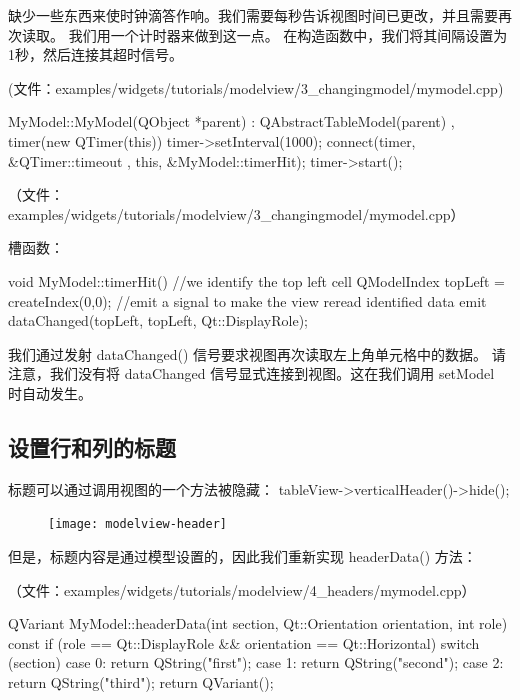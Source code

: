 缺少一些东西来使时钟滴答作响。我们需要每秒告诉视图时间已更改，并且需要再次读取。
我们用一个计时器来做到这一点。
在构造函数中，我们将其间隔设置为1秒，然后连接其超时信号。

(文件：examples/widgets/tutorials/modelview/3\_changingmodel/mymodel.cpp)

\begin{cppcode}
MyModel::MyModel(QObject *parent)
    : QAbstractTableModel(parent)
    , timer(new QTimer(this))
{
    timer->setInterval(1000);
    connect(timer, &QTimer::timeout , this, &MyModel::timerHit);
    timer->start();
}
\end{cppcode}

（文件：examples/widgets/tutorials/modelview/3\_changingmodel/mymodel.cpp）

槽函数：

\begin{cppcode}
void MyModel::timerHit()
{
    //we identify the top left cell
    QModelIndex topLeft = createIndex(0,0);
    //emit a signal to make the view reread identified data
    emit dataChanged(topLeft, topLeft, {Qt::DisplayRole});
}
\end{cppcode}

我们通过发射 dataChanged() 信号要求视图再次读取左上角单元格中的数据。
请注意，我们没有将 dataChanged 信号显式连接到视图。这在我们调用 setModel 时自动发生。

\subsection{设置行和列的标题} 

标题可以通过调用视图的一个方法被隐藏： tableView->verticalHeader()->hide();

\begin{figure}[hbt!]  
\texttt{[image: modelview-header]}
\end{figure}

但是，标题内容是通过模型设置的，因此我们重新实现 headerData() 方法：

（文件：examples/widgets/tutorials/modelview/4\_headers/mymodel.cpp）

\begin{cppcode}
QVariant MyModel::headerData(int section, Qt::Orientation orientation, int role) const
{
    if (role == Qt::DisplayRole && orientation == Qt::Horizontal) {
        switch (section) {
        case 0:
            return QString("first");
        case 1:
            return QString("second");
        case 2:
            return QString("third");
        }
    }
    return QVariant();
}
\end{cppcode}

